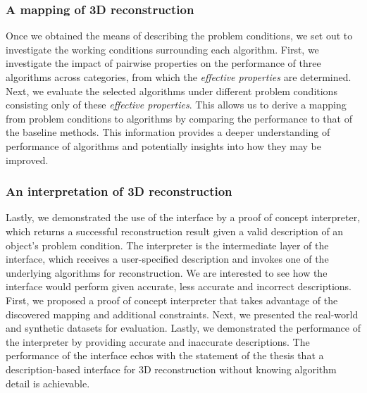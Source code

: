 \subsubsection{A mapping of 3D reconstruction}
Once we obtained the means of describing the problem conditions, we set out to investigate the working conditions surrounding each algorithm. First, we investigate the impact of pairwise properties on the performance of three algorithms across categories, from which the \textit{effective properties} are determined. Next, we evaluate the selected algorithms under different problem conditions consisting only of these \textit{effective properties}. This allows us to derive a mapping from problem conditions to algorithms by comparing the performance to that of the baseline methods. This information provides a deeper understanding of performance of algorithms and potentially insights into how they may be improved.

\subsubsection{An interpretation of 3D reconstruction}
Lastly, we demonstrated the use of the interface by a proof of concept interpreter, which returns a successful reconstruction result given a valid description of an object's problem condition. The interpreter is the intermediate layer of the interface, which receives a user-specified description and invokes one of the underlying algorithms for reconstruction. We are interested to see how the interface would perform given accurate, less accurate and incorrect descriptions. First, we proposed a proof of concept interpreter that takes advantage of the discovered mapping and additional constraints. Next, we presented the real-world and synthetic datasets for evaluation. Lastly, we demonstrated the performance of the interpreter by providing accurate and inaccurate descriptions. The performance of the interface echos with the statement of the thesis that a description-based interface for 3D reconstruction without knowing algorithm detail is achievable.\\

